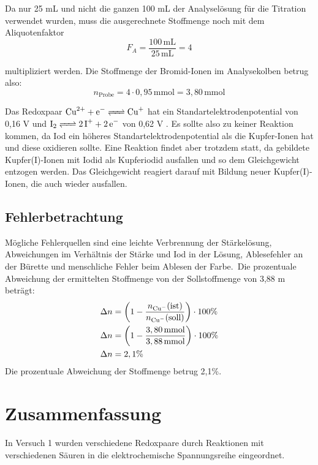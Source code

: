 \documentclass[12pt]{scrartcl} %
\begin{document}
Da nur 25 mL und nicht die ganzen 100 mL der Analyselösung für die Titration verwendet wurden, muss die ausgerechnete Stoffmenge noch mit dem Aliquotenfaktor
\begin{equation}
    F_A = \frac{100\,\text{mL}}{25\,\text{mL}} = 4
\end{equation}

multipliziert werden. Die Stoffmenge der Bromid-Ionen im Analysekolben betrug also:
\begin{equation}
    n_{\text{Probe}} = 4 \cdot 0,95\,\text{mmol} = 3,80\,\text{mmol}
\end{equation}

Das Redoxpaar $\ce{Cu^{2+} + e- <=> Cu^+}$ hat ein Standartelektrodenpotential von 0,16 V \cite{Elektrodenpotentiale} und $\ce{I2 <=> 2I^+ + 2e-}$ von 0,62 V \cite{Elektrodenpotentiale}. Es sollte also zu keiner Reaktion kommen, da Iod ein höheres Standartelektrodenpotential als die Kupfer-Ionen hat und diese oxidieren sollte. Eine Reaktion findet aber trotzdem statt, da gebildete Kupfer(I)-Ionen mit Iodid als Kupferiodid ausfallen und so dem Gleichgewicht entzogen werden. Das Gleichgewicht reagiert darauf mit Bildung neuer Kupfer(I)-Ionen, die auch wieder ausfallen.


\newpage


\subsection{Fehlerbetrachtung}
Mögliche Fehlerquellen sind eine leichte Verbrennung der Stärkelösung, Abweichungen im Verhältnis der Stärke und Iod in der Lösung, Ablesefehler an der Bürette und menschliche Fehler beim Ablesen der Farbe.\
Die prozentuale Abweichung der ermittelten Stoffmenge von der Sollstoffmenge von 3,88 m beträgt:
\begin{align*}
    \Delta n &= \left(1 - \frac{n_{\ce{Cu^-}}(\text{ist})}{n_{\ce{Cu^-}}(\text{soll})} \right) \cdot 100\%\\
    \Delta n &= \left( 1 - \frac{3,80\,\text{mmol}}{3,88\,\text{mmol}} \right) \cdot 100\%\\ 
    \Delta n &= 2,1\% 
\end{align*}
Die prozentuale Abweichung der Stoffmenge betrug 2,1\%.


\section{Zusammenfassung}
In Versuch 1 wurden verschiedene Redoxpaare durch Reaktionen mit verschiedenen Säuren in die elektrochemische Spannungsreihe eingeordnet.\\
\end{document}
